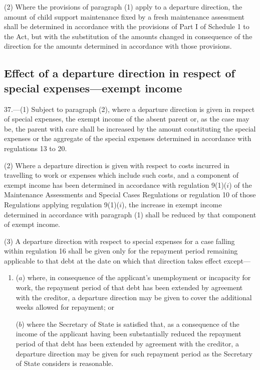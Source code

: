 \documentclass[a4paper]{article}
\begin{document}
(2) Where the provisions of paragraph (1) apply to a departure direction, the amount of child support maintenance fixed by a fresh maintenance assessment shall be determined in accordance with the provisions of Part I of Schedule 1 to the Act, but with the substitution of the amounts changed in consequence of the direction for the amounts determined in accordance with those provisions.

\subsection[37. Effect of a departure direction in respect of special expenses—exempt income]{Effect of a departure direction in respect of special expenses—\hspace{0pt}exempt income}

37.—(1) Subject to paragraph (2), where a departure direction is given in respect of special expenses, the exempt income of the absent parent or, as the case may be, the parent with care shall be increased by the amount constituting the special expenses or the aggregate of the special expenses determined in accordance with regulations 13 to 20.

(2) Where a departure direction is given with respect to costs incurred in travelling to work or expenses which include such costs, and a component of exempt income has been determined in accordance with regulation 9(1)($i$) of the Maintenance Assessments and Special Cases Regulations or regulation 10 of those Regulations applying regulation 9(1)($i$), the increase in exempt income determined in accordance with paragraph (1) shall be reduced by that component of exempt income.

(3) A departure direction with respect to special expenses for a case falling within regulation 16 shall be given only for the repayment period remaining applicable to that debt at the date on which that direction takes effect except—
\begin{enumerate}\item[]
($a$) where, in consequence of the applicant’s unemployment or incapacity for work, the repayment period of that debt has been extended by agreement with the creditor, a departure direction may be given to cover the additional weeks allowed for repayment; or

($b$) where the Secretary of State is satisfied that, as a consequence of the income of the applicant having been substantially reduced the repayment period of that debt has been extended by agreement with the creditor, a departure direction may be given for such repayment period as the Secretary of State considers is reasonable.
\end{enumerate}
\end{document}
